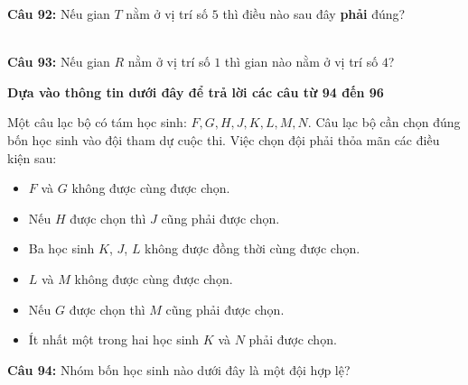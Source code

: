\documentclass[12pt,a4paper]{article}
\begin{document}
\noindent \textbf{Câu 92:} Nếu gian $T$ nằm ở vị trí số $5$ thì điều nào sau đây \textbf{phải} đúng?\\
\noindent{}\\
\noindent{}



\vspace{0.3cm}

\noindent \textbf{Câu 93:} Nếu gian $R$ nằm ở vị trí số $1$ thì gian nào nằm ở vị trí số $4$?\\
\noindent{}



\vspace{0.5cm}
\noindent\textbf{Dựa vào thông tin dưới đây để trả lời các câu từ 94 đến 96}%


\par\nobreak

Một câu lạc bộ có tám học sinh: $F, G, H, J, K, L, M, N$. Câu lạc bộ cần chọn đúng bốn học sinh vào đội tham dự cuộc thi. Việc chọn đội phải thỏa mãn các điều kiện sau:
\begin{itemize}
\item $F$ và $G$ không được cùng được chọn.
\item Nếu $H$ được chọn thì $J$ cũng phải được chọn.
\item Ba học sinh $K$, $J$, $L$ không được đồng thời cùng được chọn.
\item $L$ và $M$ không được cùng được chọn.
\item Nếu $G$ được chọn thì $M$ cũng phải được chọn.
\item Ít nhất một trong hai học sinh $K$ và $N$ phải được chọn.
\end{itemize}

\par\nobreak


\noindent \textbf{Câu 94:} Nhóm bốn học sinh nào dưới đây là một đội hợp lệ?\\
\noindent{}
\end{document}
